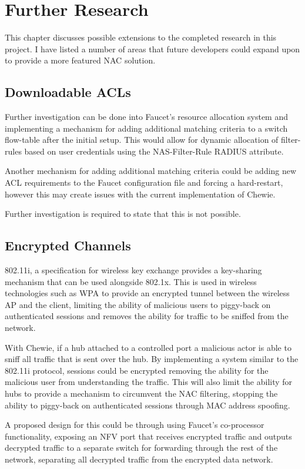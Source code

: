 \chapter{Further Research}\label{chap:future_development}
This chapter discusses possible extensions to the completed research in this project. I have listed a number of areas that future developers could expand upon to provide a more featured NAC solution.

\section{Downloadable ACLs}\label{section:dacls}
Further investigation can be done into Faucet's resource allocation system and implementing a mechanism for adding additional matching criteria to a switch flow-table after the initial setup. This would allow for dynamic allocation of filter-rules based on user credentials using the NAS-Filter-Rule RADIUS attribute.

Another mechanism for adding additional matching criteria could be adding new ACL requirements to the Faucet configuration file and forcing a hard-restart, however this may create issues with the current implementation of Chewie.

Further investigation is required to state that this is not possible.

\section{Encrypted Channels}
802.11i, a specification for wireless key exchange provides a key-sharing mechanism that can be used alongside 802.1x. This is used in wireless technologies such as WPA to provide an encrypted tunnel between the wireless AP and the client, limiting the ability of malicious users to piggy-back on authenticated sessions and removes the ability for traffic to be sniffed from the network.

With Chewie, if a hub attached to a controlled port a malicious actor is able to sniff all traffic that is sent over the hub. By implementing a system similar to the 802.11i protocol, sessions could be encrypted removing the ability for the malicious user from understanding the traffic. This will also limit the ability for hubs to provide a mechanism to circumvent the NAC filtering, stopping the ability to piggy-back on authenticated sessions through MAC address spoofing.

A proposed design for this could be through using Faucet's co-processor functionality, exposing an NFV port that receives encrypted traffic and outputs decrypted traffic to a separate switch for forwarding through the rest of the network, separating all decrypted traffic from the encrypted data network.